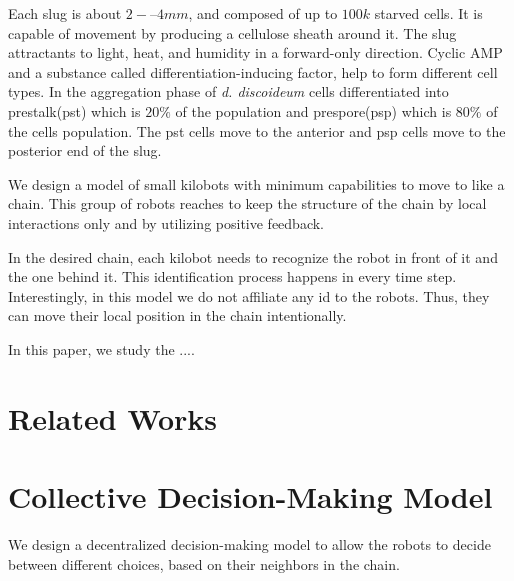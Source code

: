 \documentclass[11pt,a4paper]{article}
\begin{document}
Each slug is about $2-–4 mm$, and composed of up to $100k$ starved cells. It is capable of movement by producing a cellulose sheath around it. The slug attractants to light, heat, and humidity in a forward-only direction. Cyclic AMP and a substance called differentiation-inducing factor, help to form different cell types. In the aggregation phase of \textit{d. discoideum} cells differentiated into prestalk(pst) which is $20\%$ of the population and prespore(psp) which is $80\%$ of the cells population. The pst cells move to the anterior and psp cells move to the posterior end of the slug.

We design a model of small kilobots with minimum capabilities to move to like a chain. This group of robots reaches to keep the structure of the chain by local interactions only and by utilizing positive feedback.  

In the desired chain, each kilobot needs to recognize the robot in front of it and the one behind it. This identification process happens in every time step. Interestingly, in this model we do not affiliate any id to the robots. Thus, they can move their local position in the chain intentionally. 

In this paper, we study the ....



\section {Related Works}

\section{Collective Decision-Making Model}
We design a decentralized decision-making model to allow the robots to decide between different choices, based on their neighbors in the chain. 




 
 


 
\end{document}
